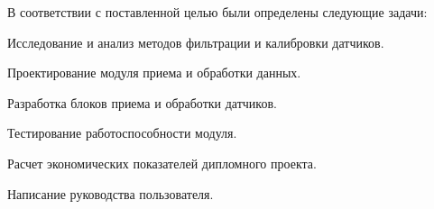 
В соответствии с поставленной целью были определены следующие задачи:
\begin{enumerate_num}
    \item Исследование и анализ методов фильтрации и калибровки датчиков.
    \item Проектирование модуля приема и обработки данных.
    \item Разработка блоков приема и обработки датчиков.
    \item Тестирование работоспособности модуля.
    \item Расчет экономических показателей дипломного проекта.
    \item Написание руководства пользователя.
\end{enumerate_num}

